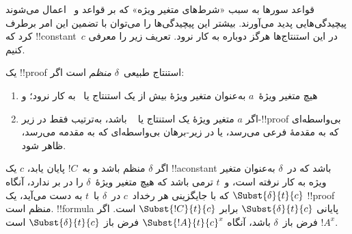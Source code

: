\documentclass[../../../include/open-logic-section]{subfiles}
\begin{document}


قواعد سورها به سبب «شرط‌های متغیر ویژه» که بر قواعد
\Elim{\lexists} و~\Intro{\lforall} اعمال می‌شوند پیچیدگی‌هایی پدید
می‌آورند. بیشتر این پیچیدگی‌ها را می‌توان با تضمین این امر برطرف کرد
که !!{constant}~$c$ در این استنتاج‌ها هرگز دوباره به کار نرود. تعریف
زیر را معرفی کنیم.

\begin{defn}
یک !!{proof} استنتاج طبیعی~$\delta$ \emph{منظم} است اگر:
\begin{enumerate}
  \item هیچ متغیر ویژهٔ~$a$ به‌عنوان متغیر ویژهٔ بیش از یک استنتاج
  \Elim{\lexists} یا~\Intro{\lforall} به کار نرود؛ و
  \item اگر $a$ متغیر ویژهٔ یک استنتاج \Elim{\lexists} یا
  ~\Intro{\lforall} باشد، به‌ترتیب فقط در زیر-!!{proof} بی‌واسطه‌ای
  که به مقدمهٔ فرعی می‌رسد، یا در زیر-برهان بی‌واسطه‌ای که به مقدمه
  می‌رسد، ظاهر شود.
\end{enumerate}
\end{defn}

\begin{lem}
اگر $\delta$ منظم باشد و به~$!C$ پایان یابد، $c$ یک !!a{constant}
باشد که در~$\delta$ به‌عنوان متغیر ویژه به کار نرفته است، و~$t$ ترمی
باشد که هیچ متغیر ویژهٔ~$\delta$ را در بر ندارد، آنگاه
$\Subst{\delta}{t}{c}$ که با جایگزینی هر رخداد~$c$ در~$\delta$ با~$t$
به دست می‌آید، یک !!{proof} منظم است. !!{formula} پایانی
$\Subst{\delta}{t}{c}$ برابر $\Subst{!C}{t}{c}$ است. اگر $!A^x$ فرض
باز~$\delta$ باشد، آنگاه $\Subst{!A}{t}{c}^x$ فرض باز
$\Subst{\delta}{t}{c}$ است.
\end{lem}
\end{document}
